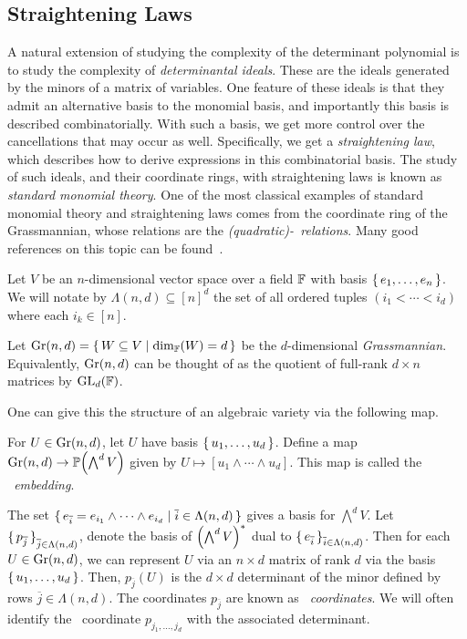\documentclass[letterpaper, 11pt]{amsart}
\begin{document}
\subsection{Straightening Laws}

A natural extension of studying the complexity of the determinant polynomial is to study the complexity of \emph{determinantal ideals}.
These are the ideals generated by the minors of a matrix of variables.
One feature of these ideals is that they admit an alternative basis to the monomial basis, and importantly this basis is described combinatorially.
With such a basis, we get more control over the cancellations that may occur as well.
Specifically, we get a \emph{straightening law}, which describes how to derive expressions in this combinatorial basis.
The study of such ideals, and their coordinate rings, with straightening laws is known as \emph{standard monomial theory}.
One of the most classical examples of standard monomial theory and straightening laws comes from the coordinate ring of the Grassmannian, whose relations are the \emph{(quadratic)-\Plucker\ relations}.
Many good references on this topic can be found~\cite{Ful96, Stu08, LB18}.

Let $V$ be an $n$-dimensional vector space over a field $\mathbb{F}$ with basis $\set{e_1, \ldots, e_n}$.
We will notate by $\Lambda(n, d) \subseteq [n]^d$ the set of all ordered tuples $(i_1 < \cdots < i_d)$ where each $i_k \in [n]$.
\begin{defn}[Grassmannian]
  Let $\operatorname{Gr}(n, d) = \set{W \subseteq V \mid \dim_{\mathbb{F}}(W) = d}$ be the $d$-dimensional \emph{Grassmannian}.
  Equivalently, $\operatorname{Gr}(n, d)$ can be thought of as the quotient of full-rank $d \times n$ matrices by $\operatorname{GL}_d(\mathbb{F})$.
\end{defn}

One can give this the structure of an algebraic variety via the following map.

\begin{defn}
  For $U \in \operatorname{Gr}(n, d)$, let $U$ have basis $\set{u_1, \ldots, u_d}$.
  Define a map $\Gr(n, d) \to \mathbb{P}\pqty{\bigwedge^d V}$ given by $U \mapsto [u_1 \land \cdots \land u_d]$.
  This map is called the \emph{\Plucker\ embedding}.

  The set $\set{e_{\overline{i}} = e_{i_1} \land \cdots \land e_{i_d} | \overline{i} \in \Lambda(n, d)}$ gives a basis for $\bigwedge^d V$.
  Let $\set{p_{\overline{j}}}_{\overline{j} \in \Lambda(n, d)}$, denote the basis of $\pqty{\bigwedge^d V}^*$ dual to $\set{e_{\overline{i}}}_{\overline{i} \in \Lambda(n, d)}$.
  Then for each $U \in \operatorname{Gr}(n, d)$, we can represent $U$ via an $n \times d$ matrix of rank $d$ via the basis $\set{u_1, \ldots, u_d}$.
  Then, $p_{\overline{j}}(U)$ is the $d \times d$ determinant of the minor defined by rows $\overline{j} \in \Lambda(n, d)$.
  The coordinates $p_{\overline{j}}$ are known as \emph{\Plucker\ coordinates}.
  We will often identify the \Plucker\ coordinate $p_{j_1, \ldots, j_d}$ with the associated determinant.
\end{defn}
\end{document}
